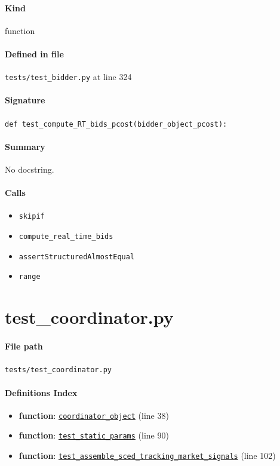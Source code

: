 \documentclass[11pt]{report}
\begin{document}
\paragraph{Kind} function
\paragraph{Defined in file} \texttt{tests/test\_bidder.py} at line 324
\paragraph{Signature} \texttt{def test\_compute\_RT\_bids\_pcost(bidder\_object\_pcost):}
\paragraph{Summary} No docstring.
\paragraph{Calls}
\begin{itemize}[leftmargin=*]
  \item \texttt{skipif}
  \item \texttt{compute\_real\_time\_bids}
  \item \texttt{assertStructuredAlmostEqual}
  \item \texttt{range}
\end{itemize}

\section{test\_coordinator.py}
\label{file:tests-test_coordinator.py}
\paragraph{File path} \texttt{tests/test\_coordinator.py}
\paragraph{Definitions Index}
\begin{itemize}[leftmargin=*]
  \item \textbf{function}: \hyperref[def:tests-test_coordinator.py:coordinator_object:L38]{\texttt{coordinator\_object}} (line 38)
  \item \textbf{function}: \hyperref[def:tests-test_coordinator.py:test_static_params:L90]{\texttt{test\_static\_params}} (line 90)
  \item \textbf{function}: \hyperref[def:tests-test_coordinator.py:test_assemble_sced_tracking_market_signals:L102]{\texttt{test\_assemble\_sced\_tracking\_market\_signals}} (line 102)
\end{itemize}
\end{document}
